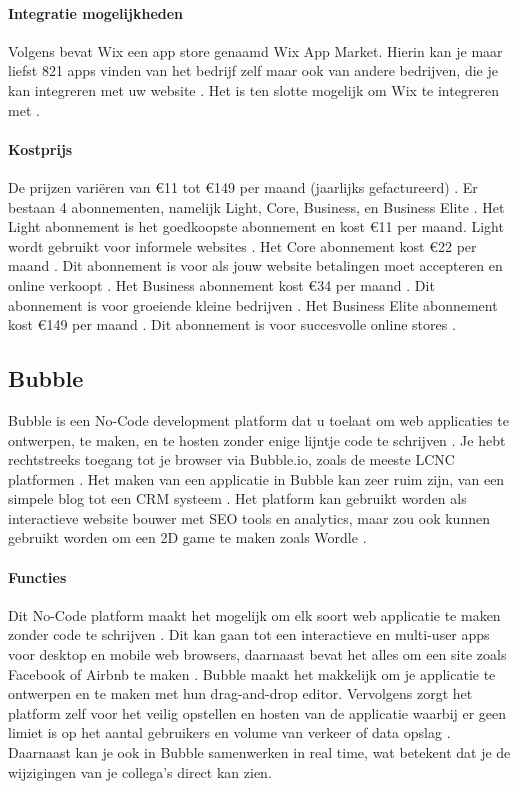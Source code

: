 \paragraph{Integratie mogelijkheden}
Volgens \textcite{Singleton2024} bevat Wix een app store genaamd Wix App Market. 
Hierin kan je maar liefst 821 apps vinden van het bedrijf zelf maar ook van andere bedrijven, die je kan integreren met uw website \autocite{Singleton2024}.
Het is ten slotte mogelijk om Wix te integreren met  \textcite{MAKE.com2024a}.

\paragraph{Kostprijs}
De prijzen variëren van €11 tot €149 per maand (jaarlijks gefactureerd) \autocite{Wix2024} \autocite{Ryan2024}. 
Er bestaan 4 abonnementen, namelijk Light, Core, Business, en Business Elite \autocite{Wix2024}.
Het Light abonnement is het goedkoopste abonnement en kost €11 per maand. Light wordt gebruikt voor informele websites \autocite{Ryan2024}.
Het Core abonnement kost €22 per maand \autocite{Wix2024}. Dit abonnement is voor als jouw website betalingen moet accepteren en online verkoopt \autocite{Ryan2024}.
Het Business abonnement kost €34 per maand \autocite{Wix2024}. Dit abonnement is voor groeiende kleine bedrijven \autocite{Ryan2024}.
Het Business Elite abonnement kost €149 per maand \autocite{Wix2024}. Dit abonnement is voor succesvolle online stores \autocite{Ryan2024}.
\subsection{Bubble}%
\label{subsec:bubble}
Bubble is een No-Code development platform dat u toelaat om web applicaties te ontwerpen, te maken, en te hosten zonder enige lijntje code te schrijven \autocite{Sharma2022}.
Je hebt rechtstreeks toegang tot je browser via Bubble.io, zoals de meeste LCNC platformen \autocite{Minor2022}. Het maken van een applicatie in Bubble kan zeer ruim zijn, van een simpele blog tot een CRM systeem \autocite{Sharma2022}.
Het platform kan gebruikt worden als interactieve website bouwer met SEO tools en analytics, maar zou ook kunnen gebruikt worden om een 2D game te maken zoals Wordle \autocite{Minor2022}.

\paragraph{Functies}
Dit No-Code platform maakt het mogelijk om elk soort web applicatie te maken zonder code te schrijven \autocite{Bubble2024b}.
Dit kan gaan tot een interactieve en multi-user apps voor desktop en mobile web browsers, daarnaast bevat het alles om een site zoals Facebook of Airbnb te maken \autocite{Bubble2024b}.
Bubble maakt het makkelijk om je applicatie te ontwerpen en te maken met hun drag-and-drop editor.
Vervolgens zorgt het platform zelf voor het veilig opstellen en hosten van de applicatie waarbij er geen limiet is op het aantal gebruikers en volume van verkeer of data opslag \autocite{Bubble2024b}.
Daarnaast kan je ook in Bubble samenwerken in real time, wat betekent dat je de wijzigingen van je collega's direct kan zien.
